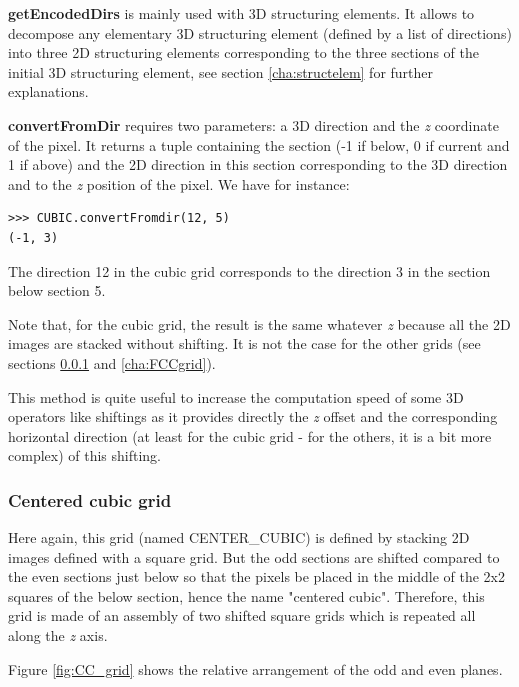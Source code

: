 \documentclass[a4paper,10pt,oneside]{article}
\begin{document}
\textbf{getEncodedDirs} is mainly used with 3D structuring elements. It allows to decompose any elementary 3D structuring element (defined
by a list of directions) into three 2D structuring elements corresponding to the three sections of the initial 3D structuring
element, see section \ref{cha:structelem} for further explanations.

\textbf{convertFromDir} requires two parameters: a 3D direction and the \emph{z} coordinate of the pixel. It returns a tuple containing the section
(-1 if below, 0 if current and 1 if above) and the 2D direction in this section corresponding to the 3D direction and to the \emph{z} position of the
pixel. We have for instance:

\lstset{language=Python}
\begin{lstlisting}
>>> CUBIC.convertFromdir(12, 5)
(-1, 3)
\end{lstlisting}

The direction 12 in the cubic grid corresponds to the direction 3 in the section below section 5.

Note that, for the cubic grid, the result is the same whatever \emph{z} because all the 2D images are stacked without shifting. It is
not the case for the other grids (see sections \ref{cha:CCgrid} and \ref{cha:FCCgrid}).

This method is quite useful to increase the computation speed of some 3D operators like shiftings as it provides directly
the \emph{z} offset and the corresponding horizontal direction (at least for the cubic grid - for the others, it is a bit more complex)
of this shifting.

\subsubsection{Centered cubic grid}
\label{cha:CCgrid}
Here again, this grid (named CENTER\_CUBIC) is defined by stacking 2D images defined with a square grid. But the odd sections
are shifted compared to the even sections just below so that the pixels be placed in the middle of the 2x2 squares of the below
section, hence the name "centered cubic". Therefore, this grid is made of an assembly of two shifted square grids which is
repeated all along the \emph{z} axis.

Figure \ref{fig:CC_grid} shows the relative arrangement of the odd and even planes.
\end{document}
